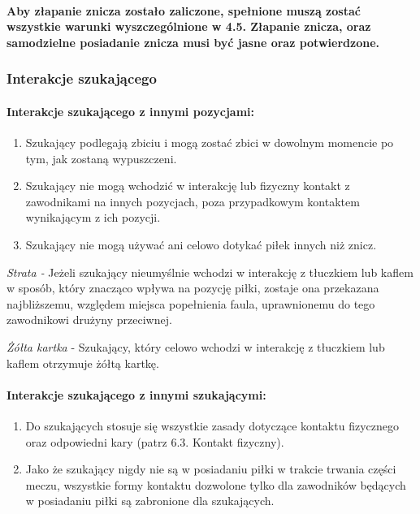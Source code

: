 \documentclass[12pt]{article}
\begin{document}
\paragraph{Aby złapanie znicza zostało zaliczone, spełnione muszą
zostać wszystkie warunki wyszczególnione w 4.5. Złapanie znicza, oraz
samodzielne posiadanie znicza musi być jasne oraz potwierdzone.}

\subsubsection{Interakcje szukającego}

\paragraph{Interakcje szukającego z innymi pozycjami: }

\begin{enumerate}
\item
    Szukający podlegają zbiciu i mogą zostać zbici w dowolnym momencie po
  tym, jak zostaną wypuszczeni.
  \item
    Szukający nie mogą wchodzić w interakcję lub fizyczny kontakt z
  zawodnikami na innych pozycjach, poza przypadkowym kontaktem
  wynikającym z ich pozycji.
  \item
    Szukający nie mogą używać ani celowo dotykać piłek innych niż znicz.
  \end{enumerate}

\emph{Strata -} Jeżeli szukający nieumyślnie wchodzi w interakcję z
tłuczkiem lub kaflem w sposób, który znacząco wpływa na pozycję piłki,
zostaje ona przekazana najbliższemu, względem miejsca popełnienia faula,
uprawnionemu do tego zawodnikowi drużyny przeciwnej.

\emph{Żółta kartka} - Szukający, który celowo wchodzi w interakcję z
tłuczkiem lub kaflem otrzymuje żółtą kartkę.

\paragraph{Interakcje szukającego z innymi szukającymi:}

\begin{enumerate}
\item
    Do szukających stosuje się wszystkie zasady dotyczące kontaktu
  fizycznego oraz odpowiedni kary (patrz 6.3. Kontakt fizyczny).
  \item
    Jako że szukający nigdy nie są w posiadaniu piłki w trakcie trwania
  części meczu, wszystkie formy kontaktu dozwolone tylko dla zawodników
  będących w posiadaniu piłki są zabronione dla szukających.
  \end{enumerate}
\end{document}
